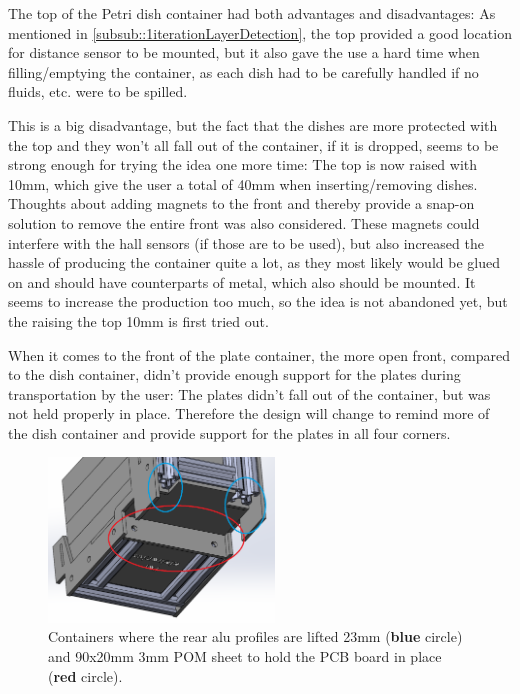 \documentclass[10pt,a4paper]{article}
\begin{document}
		
		The top of the Petri dish container had both advantages and disadvantages: As mentioned in \ref{subsub::1iterationLayerDetection}, the top provided a good location for distance sensor to be mounted, but it also gave the use a hard time when filling/emptying the container, as each dish had to be carefully handled if no fluids, etc. were to be spilled. 
		
		This is a big disadvantage, but the fact that the dishes are more protected with the top and they won't all fall out of the container, if it is dropped, seems to be strong enough for trying the idea one more time: The top is now raised with 10mm, which give the user a total of 40mm when inserting/removing dishes.\\
		
		Thoughts about adding magnets to the front and thereby provide a snap-on solution to remove the entire front was also considered. These magnets could interfere with the hall sensors (if those are to be used), but also increased the hassle of producing the container quite a lot, as they most likely would be glued on and should have counterparts of metal, which also should be mounted. It seems to increase the production too much, so the idea is not abandoned yet, but the raising the top 10mm is first tried out.
		
		
		
		When it comes to the front of the plate container, the more open front, compared to the dish container, didn't provide enough support for the plates during transportation by the user: The plates didn't fall out of the container, but was not held properly in place. Therefore the design will change to remind more of the dish container and provide support for the plates in all four corners.
		\begin{figure}
			\includegraphics[width=6cm]{images/containerSkeletonLiftet.png}
			\caption{Containers where the rear alu profiles are lifted 23mm ({\color{blue}\textbf{blue}} circle) and 90x20mm 3mm POM sheet to hold the PCB board in place ({\color{red}\textbf{red}} circle).}
			\label{fig::containerSkeletonLiftet}
		\end{figure}
		
\end{document}
